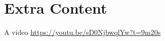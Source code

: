 


\section{Extra Content}
\begin{namedframe}{A video}
	\url{https://youtu.be/sD0NjbwqlYw?t=9m20s}
\end{namedframe}
